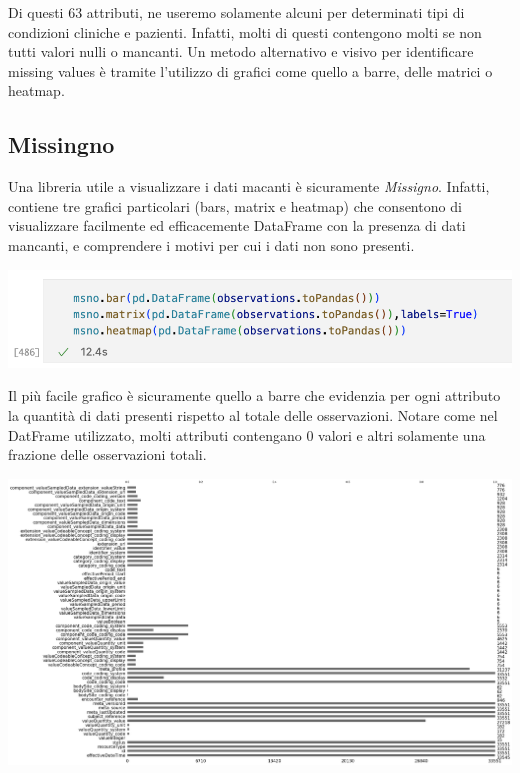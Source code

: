 \documentclass[11pt, oneside]{article}
\begin{document}
Di questi 63 attributi, ne useremo solamente alcuni per determinati tipi di condizioni cliniche e pazienti. Infatti, molti di questi contengono molti se non tutti valori nulli o mancanti. Un metodo alternativo e visivo per identificare missing values è tramite l'utilizzo di grafici come quello a barre, delle matrici o heatmap.

\subsection{Missingno}

Una libreria utile a visualizzare i dati macanti è sicuramente \emph{Missigno}. Infatti, contiene tre grafici particolari (bars, matrix e heatmap) che consentono di visualizzare facilmente ed efficacemente DataFrame con la presenza di dati mancanti, e comprendere i motivi per cui i dati non sono presenti.

\begin{center}
\includegraphics[scale=0.45]{2_msn.png}
\end{center}

Il più facile grafico è sicuramente quello a barre che evidenzia per ogni attributo la quantità di dati presenti rispetto al totale delle osservazioni. Notare come nel DatFrame utilizzato, molti attributi contengano 0 valori e altri solamente una frazione delle osservazioni totali. 

\begin{center}
\includegraphics[scale=0.2]{2_msn_bars.png}
\end{center}
\end{document}
